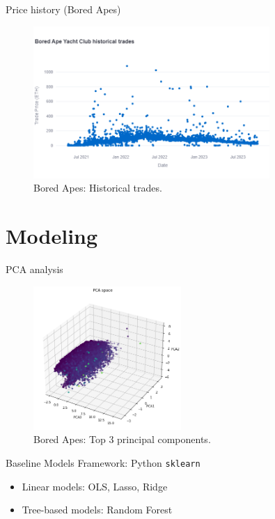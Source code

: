 \documentclass{beamer}
\begin{document}
\begin{frame}{Price history (Bored Apes)}
    \begin{figure}[t]
        \includegraphics[width=0.8\textwidth]{../figures/price_date.png}
        \caption{Bored Apes: Historical trades.}
    \end{figure}
\end{frame}


\section{Modeling}

\begin{frame}{PCA analysis}
    \begin{figure}
        \includegraphics[width=0.5\textwidth]{../figures/pca_1.png}
        \caption{Bored Apes: Top 3 principal components.}
    \end{figure}
\end{frame}

\begin{frame}{Baseline Models}
    Framework: Python \texttt{sklearn} \\
    \begin{itemize}
        \item Linear models: OLS, Lasso, Ridge
        \item Tree-based models: Random Forest
    \end{itemize}
\end{frame}
\end{document}
